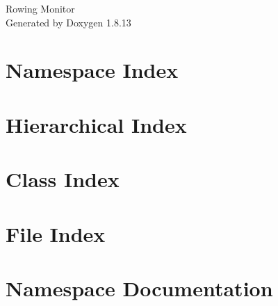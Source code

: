 \documentclass[twoside]{book}
\newcommand{\+}{\discretionary{\mbox{\scriptsize$\hookleftarrow$}}{}{}}
\newcommand{\clearemptydoublepage}{%
  \newpage{\pagestyle{empty}\cleardoublepage}%
}
\begin{document}
\hypersetup{pageanchor=false,
             bookmarksnumbered=true,
             pdfencoding=unicode
            }
\begin{titlepage}
\vspace*{7cm}
\begin{center}%
{\Large Rowing Monitor }\\
\vspace*{1cm}
{\large Generated by Doxygen 1.8.13}\\
\end{center}
\end{titlepage}
\clearemptydoublepage
{}
\tableofcontents
\clearemptydoublepage
{}
\hypersetup{pageanchor=true}

\chapter{Namespace Index}

\chapter{Hierarchical Index}

\chapter{Class Index}

\chapter{File Index}

\chapter{Namespace Documentation}








\end{document}

